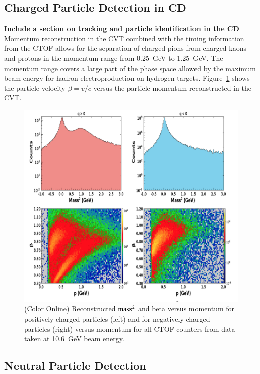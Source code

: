 \documentclass[final,3p,twocolumn]{elsarticle}
\begin{document}
\subsection{Charged Particle Detection in CD} 

{\bf Include a section on tracking and particle identification in the CD}
Momentum reconstruction in the CVT combined with the timing information from the CTOF allows for the separation 
of charged pions from charged kaons and protons in the momentum range from 0.25~GeV to 1.25~GeV. The momentum
range covers a large part of the phase space allowed by the maximum beam energy for hadron electroproduction 
on hydrogen targets. Figure~\ref{CD-PID} shows the particle velocity $\beta = v/c$ versus the particle momentum 
reconstructed in the CVT.

\begin{figure}[htbp!]
\centerline{\includegraphics[width=1.0\columnwidth]{CTOF-PID.png}}
\caption{(Color Online) Reconstructed $\rm mass^2$ and beta versus momentum for positively charged particles (left) and for
negatively charged particles (right) versus momentum for all CTOF counters from data taken at 10.6~GeV beam energy.}
\label{CD-PID}
\end{figure} 

\subsection{Neutral Particle Detection} 
\end{document}
